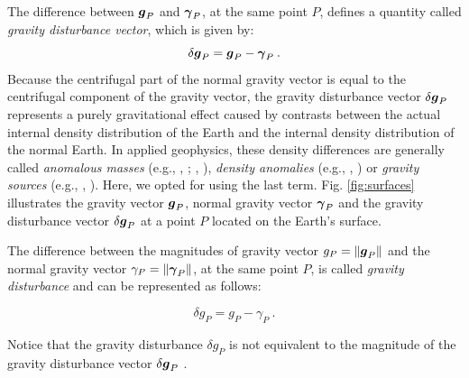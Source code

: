 \documentclass[extra]{gji}
\begin{document}
The difference between $\mitbf{g}_{P}$ and $\mitbf{\gamma}_{P}$, at the same
point $P$, defines a quantity called \textit{gravity disturbance
vector}, which is given by:
\begin{equation}
\delta \mitbf{g}_{P} =
\mitbf{g}_{P} - \mitbf{\gamma}_{P} \: .
\label{eq:gravity-disturbance-vector}
\end{equation}
Because the centrifugal part of the normal gravity vector
is equal to the centrifugal component of the gravity vector,
the gravity disturbance vector $\delta \mitbf{g}_{P}$ represents
a purely gravitational effect caused by contrasts between the actual internal
density distribution of the Earth and the internal density
distribution of the normal Earth.
In applied geophysics, these density differences are generally
called \textit{anomalous masses} (e.g., \citeauthor{hammer1945},
\citeyear{hammer1945}; \citeauthor{lafehr1965}, \citeyear{lafehr1965}),
\textit{density anomalies} (e.g., \citeauthor{forsberg1984},
\citeyear{forsberg1984}) or \textit{gravity sources} (e.g.,
\citeauthor{blakely1996}, \citeyear{blakely1996}). Here, we opted for
using the last term.
Fig. \ref{fig:surfaces} illustrates the gravity vector
$\mitbf{g}_{P}$, normal gravity vector $\mitbf{\gamma}_{P}$ and
the gravity disturbance vector $\delta \mitbf{g}_{P}$ at a point $P$
located on the Earth's surface.

The difference between the magnitudes of gravity vector
$g_{P} = \| \mitbf{g}_{P} \|$ and the normal gravity vector
$\gamma_{P} = \| \mitbf{\gamma}_{P} \|$, at the
same point $P$, is called \textit{gravity disturbance}
\citep{heiskanen-moritz1967, hofmann-wellenhof-moritz2005}
and can be represented as follows:

\begin{equation}
\delta g_{P} = g_{P} - \gamma_{P} \: .
\label{eq:gravity-disturbance}
\end{equation}

Notice that the gravity disturbance $\delta g_{P}$ is not equivalent
to the magnitude of the gravity disturbance vector
$\delta \mitbf{g}_{P}$ \citep{barthelmes2013, sanso_sideris2013}.
\end{document}
